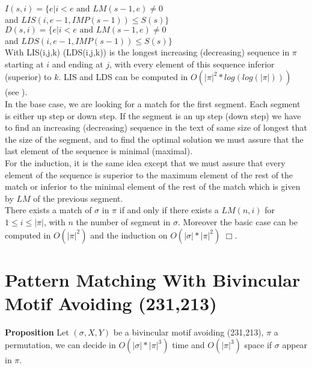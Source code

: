 \documentclass[12pt, a4paper]{article}
\newcommand{\ptext}{\pi}
\newcommand{\pmotif}{\sigma}
\newcommand{\x}{X}
\newcommand{\y}{Y}
\newcommand{\bmotif}{(\sigma,\x,\y)}
\newcounter{num}
\newcommand{\num}{\stepcounter{num} }
\begin{document}
			$I(s,i)=\{e|\text{$i<e$ and $LM(s-1,e)\neq 0$}$ \\
			\indent \indent \indent and  $LIS(i,e-1,IMP(s-1)) \leq S(s) \}$ \\
			
			$D(s,i)=\{e|\text{$i<e$ and $LM(s-1,e)\neq 0$}$ \\
			\indent \indent \indent and  $LDS(i,e-1,IMP(s-1)) \leq S(s) \}$ \\
					                       
			With LIS(i,j,k) (LDS(i,j,k)) is the longest increasing (decreasing) sequence in $\ptext$ starting at $i$ and ending at $j$,
			with every element of this sequence
			inferior (superior) to $k$. 
			LIS and LDS can be computed in $O(|\ptext|^2*log(log(|\ptext|)))$ (see \cite{Bespamyatnikh00enumeratinglongest}).\\
			
			In the base case, 
			we are looking for a match for the first segment.
			Each segment is either up step or down step.
			If the segment is an up step (down step)
			we have to find an increasing (decreasing) sequence
			in the text of same size of longest that 
			the size of the segment,
			and to find the optimal solution 
			we must assure that the last element
			of the sequence is minimal (maximal).\\
			For the induction, it is the same idea
			except that we must assure that 
			every element of the sequence is superior 
			to the maximum element of the rest of the match
			or inferior to the minimal element of the rest of the match
			which is given by $LM$ of
			the previous segment.\\
			
			There exists a match of $\pmotif$ in $\ptext$ if and only if
			there exists a $LM(n,i)$ for $1 \leq i \leq |\ptext|$,
			with $n$ the number of segment in $\pmotif$.
			Moreover the basic case can be computed in $O(|\ptext|^2)$
			and the induction on $O(|\pmotif|*|\ptext|^2)$ $\Box$.
			
					
		\section{Pattern Matching With Bivincular Motif Avoiding (231,213)}	
		
			\textbf{Proposition \num \thenum } Let $\bmotif$ be a bivincular motif 
			avoiding (231,213), 
			$\ptext$ a permutation,
			we can decide in $O(|\pmotif|*|\ptext|^3)$ time
			and $O(|\ptext|^3)$ space
			if $\pmotif$ 
			appear in $\ptext$.\\	
			
\end{document}
